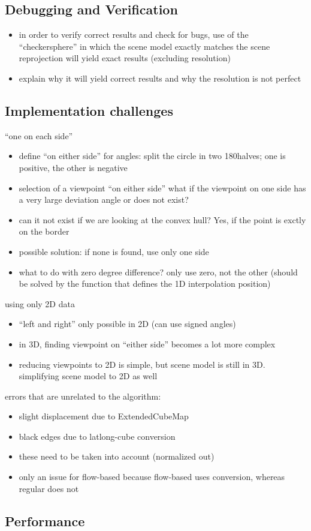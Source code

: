 \subsection{Debugging and Verification}
\begin{itemize}
  \item in order to verify correct results and check for bugs, use of the ``checkersphere'' in which the scene model exactly matches the scene \ar reprojection will yield exact results (excluding resolution)
  \item explain why it will yield correct results and why the resolution is not perfect
\end{itemize}

\subsection{Implementation challenges}
``one on each side''
\begin{itemize}
  \item define ``on either side'' for angles: split the circle in two 180\degree halves; one is positive, the other is negative
  \item selection of a viewpoint ``on either side'' \ar what if the viewpoint on one side has a very large deviation angle or does not exist?
  \item can it not exist if we are looking at the convex hull? Yes, if the point is exctly on the border
  \item possible solution: if none is found, use only one side
  \item what to do with zero degree difference? \ar only use zero, not the other (should be solved by the function that defines the 1D interpolation position)
\end{itemize}
using only 2D data
\begin{itemize}
  \item ``left and right'' only possible in 2D (can use signed angles)
  \item in 3D, finding viewpoint on ``either side'' becomes a lot more complex
  \item reducing viewpoints to 2D is simple, but scene model is still in 3D. simplifying scene model to 2D as well
\end{itemize}

errors that are unrelated to the algorithm:
\begin{itemize}
  \item slight displacement due to ExtendedCubeMap
  \item black edges due to latlong-cube conversion
  \item these need to be taken into account (normalized out)
  \item only an issue for flow-based because flow-based uses conversion, whereas regular does not
\end{itemize}

\subsection{Performance}
